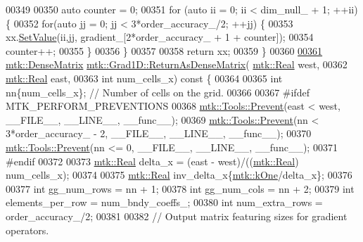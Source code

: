 \begin{DoxyCode}
{{00349 
00350   \textcolor{keyword}{auto} counter = 0;
00351   \textcolor{keywordflow}{for} (\textcolor{keyword}{auto} ii = 0; ii < dim\_null\_ + 1; ++ii) \{
00352     \textcolor{keywordflow}{for}(\textcolor{keyword}{auto} jj = 0; jj < 3*order\_accuracy\_/2; ++jj) \{
00353       xx.\hyperlink{classmtk_1_1DenseMatrix_a784ce5784109ac86bfb9d8562b334b13}{SetValue}(ii,jj, gradient\_[2*order\_accuracy\_ + 1 + counter]);
00354       counter++;
00355     \}
00356   \}
00357 
00358   \textcolor{keywordflow}{return} xx;
00359 \}
00360 
\hypertarget{mtk__grad__1d_8cc_source_l00361}{}\hyperlink{classmtk_1_1Grad1D_a77b2eddbe4ab03f469306c604d505b1a}{00361} \hyperlink{classmtk_1_1DenseMatrix}{mtk::DenseMatrix} \hyperlink{classmtk_1_1Grad1D_a77b2eddbe4ab03f469306c604d505b1a}{mtk::Grad1D::ReturnAsDenseMatrix}(
      \hyperlink{group__c01-roots_gac080bbbf5cbb5502c9f00405f894857d}{mtk::Real} west,
00362                                                   \hyperlink{group__c01-roots_gac080bbbf5cbb5502c9f00405f894857d}{mtk::Real} east,
00363                                                   \textcolor{keywordtype}{int} num\_cells\_x)\textcolor{keyword}{ const }\{
00364 
00365   \textcolor{keywordtype}{int} nn\{num\_cells\_x\}; \textcolor{comment}{// Number of cells on the grid.}
00366 
00367 \textcolor{preprocessor}{  #ifdef MTK\_PERFORM\_PREVENTIONS}
00368   \hyperlink{classmtk_1_1Tools_a332324c6f25e66be9dff48c5987a3b9f}{mtk::Tools::Prevent}(east < west, \_\_FILE\_\_, \_\_LINE\_\_, \_\_func\_\_);
00369   \hyperlink{classmtk_1_1Tools_a332324c6f25e66be9dff48c5987a3b9f}{mtk::Tools::Prevent}(nn < 3*order\_accuracy\_ - 2, \_\_FILE\_\_, \_\_LINE\_\_, \_\_func\_\_);
00370   \hyperlink{classmtk_1_1Tools_a332324c6f25e66be9dff48c5987a3b9f}{mtk::Tools::Prevent}(nn <= 0, \_\_FILE\_\_, \_\_LINE\_\_, \_\_func\_\_);
00371 \textcolor{preprocessor}{  #endif}
00372 
00373   \hyperlink{group__c01-roots_gac080bbbf5cbb5502c9f00405f894857d}{mtk::Real} delta\_x = (east - west)/((\hyperlink{group__c01-roots_gac080bbbf5cbb5502c9f00405f894857d}{mtk::Real}) num\_cells\_x);
00374 
00375   \hyperlink{group__c01-roots_gac080bbbf5cbb5502c9f00405f894857d}{mtk::Real} inv\_delta\_x\{\hyperlink{group__c01-roots_ga26407c24d43b6b95480943340d285c71}{mtk::kOne}/delta\_x\};
00376 
00377   \textcolor{keywordtype}{int} gg\_num\_rows = nn + 1;
00378   \textcolor{keywordtype}{int} gg\_num\_cols = nn + 2;
00379   \textcolor{keywordtype}{int} elements\_per\_row = num\_bndy\_coeffs\_;
00380   \textcolor{keywordtype}{int} num\_extra\_rows = order\_accuracy\_/2;
00381 
00382   \textcolor{comment}{// Output matrix featuring sizes for gradient operators.}
}}
\end{DoxyCode}
